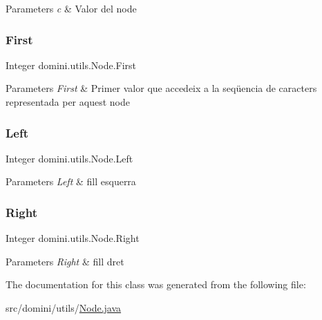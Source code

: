 \begin{DoxyParams}{Parameters}
{\em c} & Valor del node \\
\hline
\end{DoxyParams}
\mbox{\label{classdomini_1_1utils_1_1Node_a42db9f259f129c72cab2052a0f8ba42a}} 
\subsubsection{\texorpdfstring{First}{First}}
{\footnotesize\ttfamily Integer domini.\+utils.\+Node.\+First\hspace{0.3cm}{\ttfamily [package]}}


\begin{DoxyParams}{Parameters}
{\em First} & Primer valor que accedeix a la seqüencia de caracters representada per aquest node \\
\hline
\end{DoxyParams}
\mbox{\label{classdomini_1_1utils_1_1Node_a2f1d911cf52953b29d42e5e020b82dbf}} 
\subsubsection{\texorpdfstring{Left}{Left}}
{\footnotesize\ttfamily Integer domini.\+utils.\+Node.\+Left\hspace{0.3cm}{\ttfamily [package]}}


\begin{DoxyParams}{Parameters}
{\em Left} & fill esquerra \\
\hline
\end{DoxyParams}
\mbox{\label{classdomini_1_1utils_1_1Node_a73c97e595bad2513ee0a06ee4620236a}} 
\subsubsection{\texorpdfstring{Right}{Right}}
{\footnotesize\ttfamily Integer domini.\+utils.\+Node.\+Right\hspace{0.3cm}{\ttfamily [package]}}


\begin{DoxyParams}{Parameters}
{\em Right} & fill dret \\
\hline
\end{DoxyParams}


The documentation for this class was generated from the following file\+:\begin{DoxyCompactItemize}
\item 
src/domini/utils/\hyperlink{Node_8java}{Node.\+java}\end{DoxyCompactItemize}
